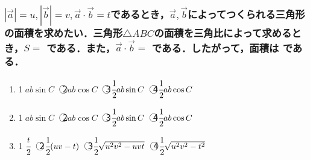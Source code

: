 \documentclass[onecolumn,10pt]{jarticle}
\newcommand{\ctext}[1]{\textcircled{\scriptsize #1}}
\begin{document}
\subsubsection{$|\vec{a}|=u,|\vec{b}|=v,\vec{a}\cdot\vec{b}=t$であるとき，$\vec{a},\vec{b}$によってつくられる三角形の面積を求めたい．三角形$\triangle{ABC}$の面積を三角比によって求めるとき，$S=$  である．また，$\vec{a}\cdot\vec{b}=$  である．したがって，面積は  である．}
\begin{enumerate}[(1)]
    \item \ctext{1}$ab\sin{C}$　\ctext{2}$ab\cos{C}$　\ctext{3}$\cfrac{1}{2}ab\sin{C}$　\ctext{4}$\cfrac{1}{2}ab\cos{C}$
    \item \ctext{1}$ab\sin{C}$　\ctext{2}$ab\cos{C}$　\ctext{3}$\cfrac{1}{2}ab\sin{C}$　\ctext{4}$\cfrac{1}{2}ab\cos{C}$
    \item \ctext{1}$\cfrac{t}{2}$　\ctext{2}$\cfrac{1}{2}(uv-t)$　\ctext{3}$\cfrac{1}{2}\sqrt{u^2v^2-uvt}$　\ctext{4}$\cfrac{1}{2}\sqrt{u^2v^2-t^2}$
\end{enumerate}
\end{document}
